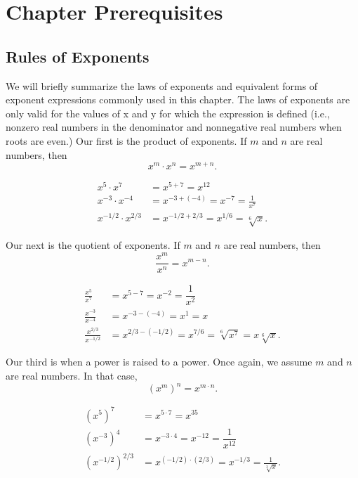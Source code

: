 \section{Chapter Prerequisites}
\label{sec:deriv_prereqs}

\prereqIntro

\subsection{Rules of Exponents}

We will briefly summarize the laws of exponents and equivalent forms of exponent expressions commonly used in this chapter.  The laws of exponents are only valid for the values of x and y for which the expression is defined (i.e., nonzero real numbers in the denominator and nonnegative real numbers when roots are even.) Our first is the product of exponents.  If $m$ and $n$ are real numbers, then
\[x^m\cdot x^n=x^{m+n}.\]

\begin{example}\label{prereq_exp_prod}
\setlength{\abovedisplayskip}{-1.5ex}
\begin{align*}
 x^5 \cdot x^7 &= x^{5+7}=x^{12} \\
 x^{-3}\cdot x^{-4} &= x^{-3+(-4)}=x^{-7}=\frac1{x^7} \\
 x^{-1/2}\cdot x^{2/3} &= x^{-1/2+2/3}=x^{1/6}=\sqrt[6]{x}.
\end{align*}
\end{example}

Our next is the quotient of exponents.  If $m$ and $n$ are real numbers, then
\[\frac{x^m}{x^n}=x^{m-n}.\]

\begin{example}\label{prereq_exp_quot}
\setlength{\abovedisplayskip}{-1.5ex}
\begin{align*}
 \frac{x^5}{x^7} &= x^{5-7}=x^{-2}=\dfrac1{x^2} \\
 \frac{x^{-3}}{x^{-4}} &= x^{-3-(-4)}=x^{1}=x \\
 \frac{x^{2/3}}{x^{-1/2}}
 &= x^{2/3-(-1/2)}=x^{7/6}=\sqrt[6]{x^7}=x\sqrt[6]{x}.
\end{align*}
\end{example}

Our third is when a power is raised to a power.  Once again, we assume $m$ and $n$ are real numbers.  In that case,
\[(x^m)^n=x^{m\cdot n}.\]

\begin{example}\label{prereq_exp_pow}
\setlength{\abovedisplayskip}{-1.5ex}
\begin{align*}
 (x^5)^7 &= x^{5\cdot 7}=x^{35} \\
 (x^{-3})^4 &= x^{-3\cdot4}=x^{-12}=\dfrac1{x^{12}} \\
 (x^{-1/2})^{2/3} &= x^{(-1/2)\cdot(2/3)}=x^{-1/3}=\frac1{\sqrt[3]{x}}.
\end{align*}
\end{example}

